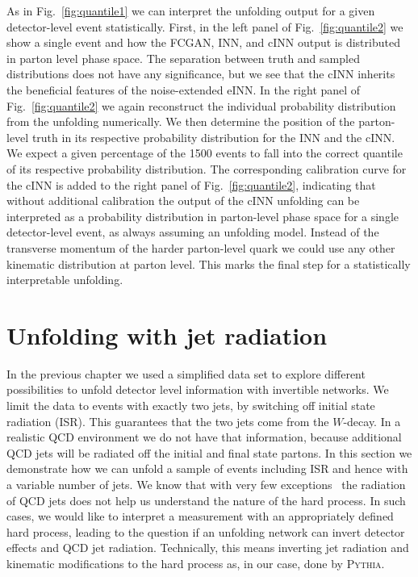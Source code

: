 As in Fig.~\ref{fig:quantile1} we can interpret the unfolding output
for a given detector-level event statistically. First, in the left
panel of Fig.~\ref{fig:quantile2} we show a single event and how the
FCGAN, INN, and cINN output is distributed in parton level phase
space. The separation
between truth and sampled distributions does not have any
significance, but we see that the cINN inherits the beneficial
features of the noise-extended eINN.  In the right panel of
Fig.~\ref{fig:quantile2} we again reconstruct the individual
probability distribution from the unfolding numerically. We then
determine the position of the parton-level truth in its respective
probability distribution for the INN and the cINN. We expect a given
percentage of the 1500 events to fall into the correct quantile of its
respective probability distribution. The corresponding calibration
curve for the cINN is added to the right panel of
Fig.~\ref{fig:quantile2}, indicating that without additional
calibration the output of the cINN unfolding can be interpreted as a
probability distribution in parton-level phase space for a single
detector-level event, as always assuming an unfolding model. Instead
of the transverse momentum of the harder parton-level quark we could
use any other kinematic distribution at parton level. This marks the
final step for a statistically interpretable unfolding.

\section{Unfolding with jet radiation}
\label{sec:jets}

In the previous chapter we used a simplified data set to explore
different possibilities to unfold detector level information with
invertible networks. We limit the data to events with exactly two
jets, by switching off initial state radiation (ISR). This guarantees
that the two jets come from the $W$-decay. 
In a realistic QCD environment we do not
have that information, because additional QCD jets will be radiated
off the initial and final state partons. In this section we
demonstrate how we can unfold a sample of events including ISR and
hence with a variable number of jets. We know that with very few
exceptions~\cite{Buckley:2014fqa} the radiation of QCD
jets does not help us understand the nature of the hard process. In
such cases, we would like to interpret a measurement with an
appropriately defined hard process, leading to the question if an
unfolding network can invert detector effects and QCD jet
radiation. Technically, this means inverting jet radiation and
kinematic modifications to the hard process as, in our case, done by
\textsc{Pythia}.


